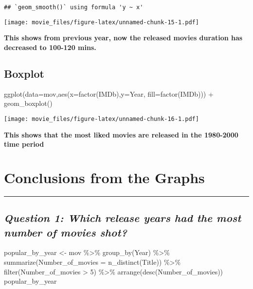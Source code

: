 \documentclass[
]{article}
\newenvironment{Shaded}{\begin{snugshade}}{\end{snugshade}}
\newcommand{\AttributeTok}[1]{\textcolor[rgb]{0.77,0.63,0.00}{#1}}
\newcommand{\DecValTok}[1]{\textcolor[rgb]{0.00,0.00,0.81}{#1}}
\newcommand{\FunctionTok}[1]{\textcolor[rgb]{0.00,0.00,0.00}{#1}}
\newcommand{\NormalTok}[1]{#1}
\newcommand{\OtherTok}[1]{\textcolor[rgb]{0.56,0.35,0.01}{#1}}
\newcommand{\SpecialCharTok}[1]{\textcolor[rgb]{0.00,0.00,0.00}{#1}}
\begin{document}
\begin{verbatim}
## `geom_smooth()` using formula 'y ~ x'
\end{verbatim}

\texttt{[image: movie\_files/figure-latex/unnamed-chunk-15-1.pdf]}

\textbf{This shows from previous year, now the released movies duration
has decreased to 100-120 mins.}

\hypertarget{box}{%
\subsection{Boxplot}\label{box}}

\begin{Shaded}
\begin{Highlighting}[]
\FunctionTok{ggplot}\NormalTok{(}\AttributeTok{data=}\NormalTok{mov,}\FunctionTok{aes}\NormalTok{(}\AttributeTok{x=}\FunctionTok{factor}\NormalTok{(IMDb),}\AttributeTok{y=}\NormalTok{Year, }\AttributeTok{fill=}\FunctionTok{factor}\NormalTok{(IMDb))) }\SpecialCharTok{+} \FunctionTok{geom\_boxplot}\NormalTok{()}
\end{Highlighting}
\end{Shaded}

\texttt{[image: movie\_files/figure-latex/unnamed-chunk-16-1.pdf]}

\textbf{This shows that the most liked movies are released in the
1980-2000 time period}

\hypertarget{conclusion}{%
\section{\texorpdfstring{\textbf{Conclusions from the
Graphs}}{Conclusions from the Graphs}}\label{conclusion}}

\begin{center}\rule{0.5\linewidth}{0.5pt}\end{center}

\hypertarget{q1}{%
\subsection{\texorpdfstring{\emph{Question 1: Which release years had
the most number of movies
shot?}}{Question 1: Which release years had the most number of movies shot?}}\label{q1}}

\begin{Shaded}
\begin{Highlighting}[]
\NormalTok{popular\_by\_year }\OtherTok{\textless{}{-}}\NormalTok{ mov }\SpecialCharTok{\%\textgreater{}\%}
  \FunctionTok{group\_by}\NormalTok{(Year) }\SpecialCharTok{\%\textgreater{}\%}
  \FunctionTok{summarize}\NormalTok{(}\AttributeTok{Number\_of\_movies =} \FunctionTok{n\_distinct}\NormalTok{(Title)) }\SpecialCharTok{\%\textgreater{}\%}
  \FunctionTok{filter}\NormalTok{(Number\_of\_movies }\SpecialCharTok{\textgreater{}} \DecValTok{5}\NormalTok{) }\SpecialCharTok{\%\textgreater{}\%}
  \FunctionTok{arrange}\NormalTok{(}\FunctionTok{desc}\NormalTok{(Number\_of\_movies))}
\NormalTok{popular\_by\_year}
\end{Highlighting}
\end{Shaded}
\end{document}
